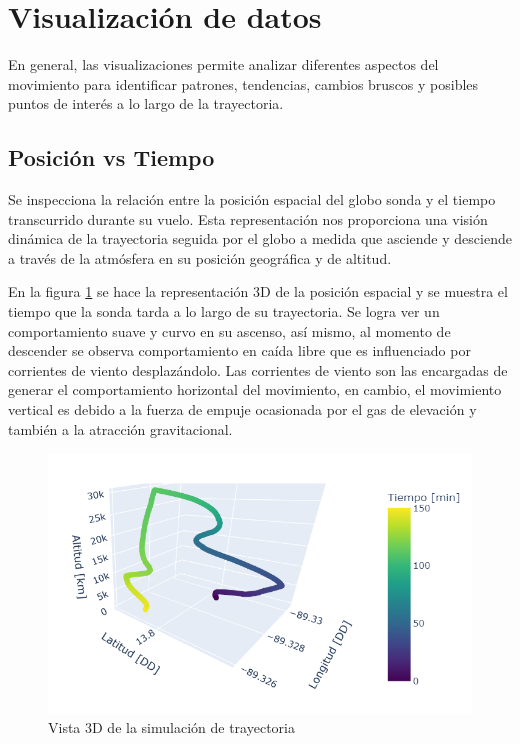 \newpage

\section{Visualización de datos}

En general, las visualizaciones  permite analizar diferentes aspectos del movimiento para identificar patrones, tendencias, cambios bruscos y posibles puntos de interés a lo largo de la trayectoria.


\subsection{Posición vs Tiempo}

Se inspecciona la relación entre la posición espacial del globo sonda y el tiempo transcurrido durante su vuelo. Esta representación nos proporciona una visión dinámica de la trayectoria seguida por el globo a medida que asciende y desciende a través de la atmósfera en  su posición geográfica y de altitud.

En la figura \ref{fig:3d_trayectoria} se hace la representación 3D de la posición espacial y se muestra el tiempo que la sonda tarda a lo largo de su trayectoria.  Se logra ver un comportamiento suave y curvo en su ascenso, así mismo, al momento de descender se observa comportamiento en caída libre que es influenciado por corrientes de viento desplazándolo. Las corrientes de viento son las encargadas de generar el comportamiento horizontal del movimiento, en cambio, el movimiento vertical es debido a la fuerza de empuje ocasionada por el gas de elevación  y también a la atracción gravitacional.

\begin{figure}[!h]
    \centering
    \includegraphics[width=0.75\linewidth]{document/figures/03_simu_grafico_3D_trayectoria.png}
    \caption{Vista 3D de la simulación de trayectoria}
    \label{fig:3d_trayectoria}
\end{figure}

